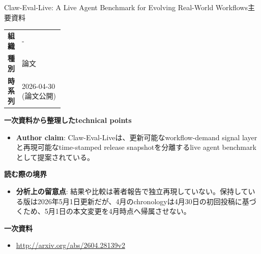 \begin{technicalnote}{Claw-Eval-Live: A Live Agent Benchmark for Evolving Real-World Workflows}{主要資料}
\begingroup
\begin{tabularx}{\linewidth}{@{}>{\bfseries}p{0.22\linewidth}X@{}}
組織 & - \\
種別 & 論文 \\
時系列 & 2026-04-30 (論文公開) \\
\end{tabularx}
\smallskip
{\bfseries 一次資料から整理したtechnical points}
\begin{itemize}[leftmargin=1.5em,itemsep=0.35em]
\item \textbf{Author claim}: Claw-Eval-Liveは、更新可能なworkflow-demand signal layerと再現可能なtime-stamped release snapshotを分離するlive agent benchmarkとして提案されている。
\end{itemize}
{\bfseries 読む際の境界}
\begin{itemize}[leftmargin=1.5em,itemsep=0.35em]
\item \textbf{分析上の留意点}: 結果や比較は著者報告で独立再現していない。保持している版は2026年5月1日更新だが、4月のchronologyは4月30日の初回投稿に基づくため、5月1日の本文変更を4月時点へ帰属させない。
\end{itemize}
\begin{samepage}
{\bfseries 一次資料}
\begingroup\sloppy
\begin{itemize}[leftmargin=1.5em,itemsep=0.25em]
\item {\scriptsize\url{http://arxiv.org/abs/2604.28139v2}}
\end{itemize}
\endgroup
\end{samepage}
\endgroup
\end{technicalnote}
\medskip

